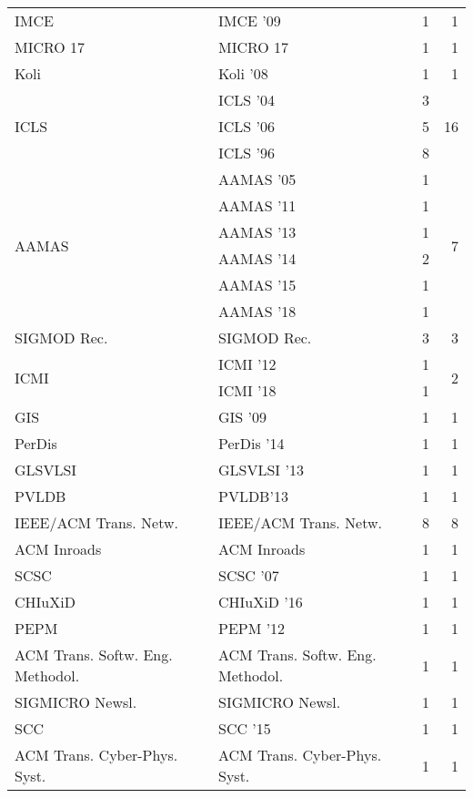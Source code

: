 \begin{table*}[t]
\begin{tabular}{llrr}
\multirow{1}{*}{IMCE } & IMCE '09 & 1 & \multirow{1}{*}{1}\\
\multirow{1}{*}{MICRO 17} & MICRO 17 & 1 & \multirow{1}{*}{1}\\
\multirow{1}{*}{Koli } & Koli '08 & 1 & \multirow{1}{*}{1}\\
\multirow{3}{*}{ICLS } & ICLS '04 & 3 & \multirow{3}{*}{16}\\
& ICLS '06 & 5 &\\
& ICLS '96 & 8 &\\
\multirow{6}{*}{AAMAS } & AAMAS '05 & 1 & \multirow{6}{*}{7}\\
& AAMAS '11 & 1 &\\
& AAMAS '13 & 1 &\\
& AAMAS '14 & 2 &\\
& AAMAS '15 & 1 &\\
& AAMAS '18 & 1 &\\
\multirow{1}{*}{SIGMOD Rec.} & SIGMOD Rec. & 3 & \multirow{1}{*}{3}\\
\multirow{2}{*}{ICMI } & ICMI '12 & 1 & \multirow{2}{*}{2}\\
& ICMI '18 & 1 &\\
\multirow{1}{*}{GIS } & GIS '09 & 1 & \multirow{1}{*}{1}\\
\multirow{1}{*}{PerDis } & PerDis '14 & 1 & \multirow{1}{*}{1}\\
\multirow{1}{*}{GLSVLSI } & GLSVLSI '13 & 1 & \multirow{1}{*}{1}\\
\multirow{1}{*}{PVLDB} & PVLDB'13 & 1 & \multirow{1}{*}{1}\\
\multirow{1}{*}{IEEE/ACM Trans. Netw.} & IEEE/ACM Trans. Netw. & 8 & \multirow{1}{*}{8}\\
\multirow{1}{*}{ACM Inroads} & ACM Inroads & 1 & \multirow{1}{*}{1}\\
\multirow{1}{*}{SCSC } & SCSC '07 & 1 & \multirow{1}{*}{1}\\
\multirow{1}{*}{CHIuXiD } & CHIuXiD '16 & 1 & \multirow{1}{*}{1}\\
\multirow{1}{*}{PEPM } & PEPM '12 & 1 & \multirow{1}{*}{1}\\
\multirow{1}{*}{ACM Trans. Softw. Eng. Methodol.} & ACM Trans. Softw. Eng. Methodol. & 1 & \multirow{1}{*}{1}\\
\multirow{1}{*}{SIGMICRO Newsl.} & SIGMICRO Newsl. & 1 & \multirow{1}{*}{1}\\
\multirow{1}{*}{SCC } & SCC '15 & 1 & \multirow{1}{*}{1}\\
\multirow{1}{*}{ACM Trans. Cyber-Phys. Syst.} & ACM Trans. Cyber-Phys. Syst. & 1 & \multirow{1}{*}{1}\\

\end{tabular}
\end{table*}
